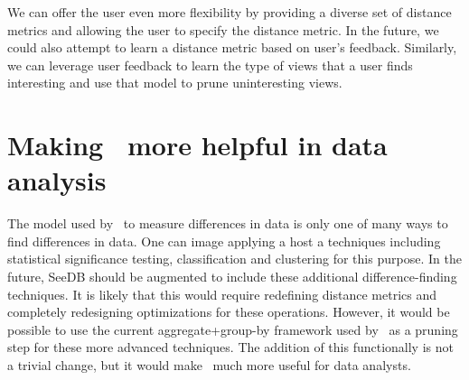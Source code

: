 We can offer the user even more flexibility by providing a diverse set of
distance metrics and allowing the user to specify the distance metric. In the
future, we could also attempt to learn a distance metric based on user's
feedback. Similarly, we can leverage user feedback to learn the type of views
that a user finds interesting and use that model to prune uninteresting views.

\section{Making \SeeDB\ more helpful in data analysis} The model used by \SeeDB\
to measure differences in data is only one of many ways to find differences in
data. One can image applying a host a techniques including statistical
significance testing, classification and clustering for this purpose. In the
future, SeeDB should be augmented to include these additional difference-finding
techniques. It is likely that this would require redefining distance metrics and
completely redesigning optimizations for these operations. However, it would be
possible to use the current aggregate+group-by framework used by \SeeDB\ as a
pruning step for these more advanced techniques.
The addition of this functionally is not a trivial change, but it would make
\SeeDB\ much more useful for data analysts.
